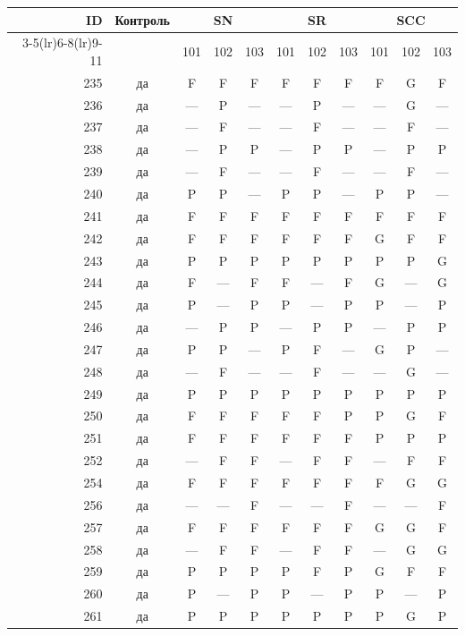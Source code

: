 \begin{table}[p]\centering\small
\begin{tabular*}{\textwidth}{@{\extracolsep{\fill}}rc*{9}{c}@{}}\toprule
ID & Контроль & \multicolumn{3}{c}{SN} & \multicolumn{3}{c}{SR} & \multicolumn{3}{c}{SCC}\\
\cmidrule(lr){3-5}\cmidrule(lr){6-8}\cmidrule(lr){9-11}
 & & 101 & 102 & 103 & 101 & 102 & 103 & 101 & 102 & 103\\\midrule
235 & да & F & F & F & F & F & F & F & G & F\\
236 & да & — & P & — & — & P & — & — & G & —\\
237 & да & — & F & — & — & F & — & — & F & —\\
238 & да & — & P & P & — & P & P & — & P & P\\
239 & да & — & F & — & — & F & — & — & F & —\\
240 & да & P & P & — & P & P & — & P & P & —\\
241 & да & F & F & F & F & F & F & F & F & F\\
242 & да & F & F & F & F & F & F & G & F & F\\
243 & да & P & P & P & P & P & P & P & P & G\\
244 & да & F & — & F & F & — & F & G & — & G\\
245 & да & P & — & P & P & — & P & P & — & P\\
246 & да & — & P & P & — & P & P & — & P & P\\
247 & да & P & P & — & P & F & — & G & P & —\\
248 & да & — & F & — & — & F & — & — & G & —\\
249 & да & P & P & P & P & P & P & P & P & P\\
250 & да & F & F & F & F & F & P & P & G & F\\
251 & да & F & F & F & F & F & F & P & P & P\\
252 & да & — & F & F & — & F & F & — & F & F\\
254 & да & F & F & F & F & F & F & F & G & G\\
256 & да & — & — & F & — & — & F & — & — & F\\
257 & да & F & F & F & F & F & F & G & G & F\\
258 & да & — & F & F & — & F & F & — & G & G\\
259 & да & P & P & P & P & F & P & G & F & F\\
260 & да & P & — & P & P & — & P & P & — & P\\
261 & да & P & P & P & P & P & P & P & G & P\\

\end{tabular*}
\end{table}
